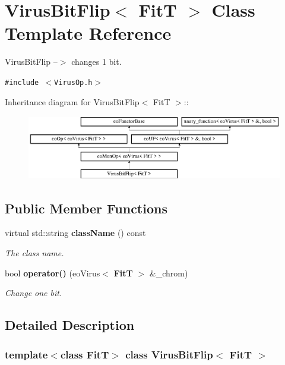 \section{Virus\-Bit\-Flip$<$ Fit\-T $>$ Class Template Reference}
\label{class_virus_bit_flip}
Virus\-Bit\-Flip --$>$ changes 1 bit.  


{\tt \#include $<$Virus\-Op.h$>$}

Inheritance diagram for Virus\-Bit\-Flip$<$ Fit\-T $>$::\begin{figure}[H]
\begin{center}
\leavevmode
\includegraphics[height=2.81761cm]{class_virus_bit_flip}
\end{center}
\end{figure}
\subsection*{Public Member Functions}
\begin{CompactItemize}
\item 
virtual std::string {\bf class\-Name} () const \label{class_virus_bit_flip_a0}

\begin{CompactList}\small\item\em The class name. \item\end{CompactList}\item 
bool {\bf operator()} (eo\-Virus$<$ {\bf Fit\-T} $>$ \&\_\-chrom)
\begin{CompactList}\small\item\em Change one bit. \item\end{CompactList}\end{CompactItemize}


\subsection{Detailed Description}
\subsubsection*{template$<$class Fit\-T$>$ class Virus\-Bit\-Flip$<$ Fit\-T $>$}

